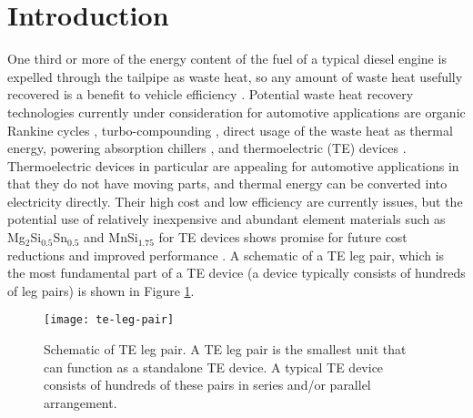 \documentclass[preprint,authoryear,12pt]{elsarticle}
\begin{document}
\section{Introduction}
\label{sec:intro}


One third or more of the energy content of the fuel of a typical
diesel engine is expelled through the tailpipe as waste heat, so any
amount of waste heat usefully recovered is a benefit to vehicle
efficiency \cite{heywood_internal_1988,caton_operating_2000,%
  endo_study_2007}. Potential waste heat recovery technologies
currently under consideration for automotive applications are organic
Rankine cycles \cite{miller_modeling_2009}, turbo-compounding
\cite{weerasinghe_thermal_2010}, direct usage of the waste heat as
thermal energy, powering absorption chillers \cite{talom_heat_2009},
and thermoelectric (TE) devices
\cite{miller_modeling_2009,hendricks_thermal_2007,hendricks_advanced_2002%
  ,hussain_thermoelectric_2009,crane_introduction_2011,%
  crane_optimization_2004,crane_towards_2001}.  Thermoelectric devices
in particular are appealing for automotive applications in that they
do not have moving parts, and thermal energy can be converted into
electricity directly.  Their high cost and low efficiency are
currently issues, but the potential use of relatively inexpensive and
abundant element materials such as Mg$_2$Si$_{0.5}$Sn$_{0.5}$ and
MnSi$_{1.75}$ for TE devices shows promise for future cost reductions
and improved performance \cite{rowe_thermoelectrics_2006}.  A
schematic of a TE leg pair, which is the most fundamental part of a TE
device (a device typically consists of hundreds of leg pairs) is shown
in Figure \ref{fig:te-pair-first-look}.
\begin{figure}[H]
  \centering
  \texttt{[image: te-leg-pair]}
  \caption{Schematic of TE leg pair.  A TE leg pair is the smallest
    unit that can function as a standalone TE device.  A typical TE
    device consists of hundreds of these pairs in series and/or
    parallel arrangement.}
  \label{fig:te-pair-first-look}
\end{figure}
\end{document}
